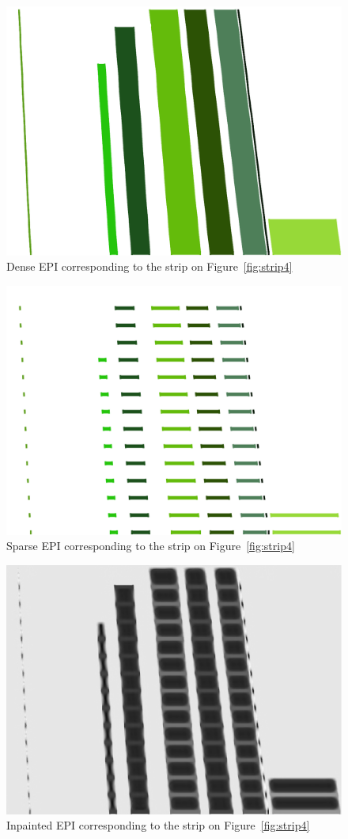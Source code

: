 \begin{itemize}
\begin{figure}[h!]
\centering
\includegraphics[width = 0.7 \textwidth]{./Diagrams/results/EPIs/292_8_102_7_34_8_dense.png}
\caption{Dense EPI corresponding to the strip on Figure~\ref{fig:strip4}}
\label{fig:dense4}
\end{figure}

\begin{figure}[h!]
\centering
\includegraphics[width = 0.7 \textwidth]{./Diagrams/results/EPIs/292_8_102_7_34_8_sparse.png}
\caption{Sparse EPI corresponding to the strip on Figure~\ref{fig:strip4}}
\label{fig:sparse4}
\end{figure}

\begin{figure}[h!]
\centering
\includegraphics[width = 0.7 \textwidth]{./Diagrams/results/Inpainted/292_8_102_7_34_8_inpainted.png}
\caption{Inpainted EPI corresponding to the strip on Figure~\ref{fig:strip4}}
\label{fig:inpainted4}
\end{figure}



\end{itemize}
